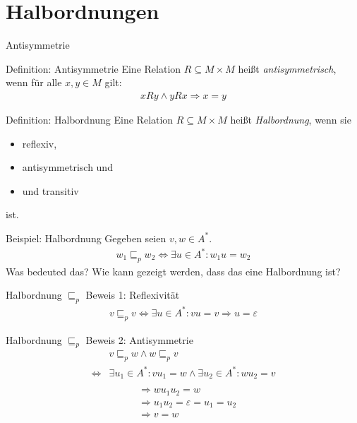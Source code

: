 \section{Halbordnungen}
\begin{frame}{Antisymmetrie}
    \begin{block}{Definition: Antisymmetrie}
        Eine Relation $R\subseteq M\times M$ heißt \emph{antisymmetrisch}, wenn für alle $x, y \in M$ gilt:
        \begin{align*}
            xRy \wedge yRx \Rightarrow x=y
        \end{align*}
    \end{block}
    \pause
    \begin{block}{Definition: Halbordnung}
        Eine Relation $R \subseteq M\times M$ heißt \emph{Halbordnung}, wenn sie
        \begin{itemize}
            \item reflexiv,
            \item antisymmetrisch und
            \item und transitiv
        \end{itemize}
        ist.
    \end{block}
\end{frame}
\begin{frame}{Beispiel: Halbordnung}
    Gegeben seien $v, w \in A^*$.
    \begin{align*}
        w_1 \sqsubseteq_p w_2 \Longleftrightarrow \exists u \in A^*:w_1u = w_2
    \end{align*}
    Was bedeuted das?
    \pause
    Wie kann gezeigt werden, dass das eine Halbordnung ist?
\end{frame}
\begin{frame}{Halbordnung $\sqsubseteq_p$ Beweis 1: Reflexivität}
    \begin{align*}
        v\sqsubseteq_p v \iff \exists u \in A^*:vu = v \Rightarrow u = \varepsilon
    \end{align*}
\end{frame}
\begin{frame}{Halbordnung $\sqsubseteq_p$ Beweis 2: Antisymmetrie}
    \begin{align*}
        & v \sqsubseteq_p w \wedge w \sqsubseteq_p v\\
        \iff & \exists u_1 \in A^*:vu_1 = w \wedge \exists u_2 \in A^*: wu_2 = v\\
    \end{align*}
    \begin{align*}
        &\Rightarrow  wu_1u_2 = w  \\
        &\Rightarrow  u_1u_2 = \varepsilon = u_1 = u_2 \\
        &\Rightarrow  v = w 
    \end{align*}
\end{frame}
